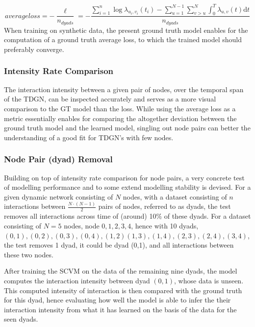 \begin{equation}
   average loss = - \frac{\ell}{n_{dyads}} = - \frac{\sum_{i=1}^n \log \lambda_{u_i,v_i} (t_i) - \sum_{u=1}^{N-1} \sum_{v > u}^{N} \int_{0}^T \lambda_{u,v}(t) \mathrm{d} t}{n_{dyads}}
    \label{eq:LogLikelihoodFuncExplicit}
\end{equation}
When training on synthetic data, the present ground truth model enables for the computation of a ground truth average loss, to which the trained model should preferably converge.


\subsubsection{Intensity Rate Comparison}
\label{sec:Method:Evaluation:Intensity}
The interaction intensity between a given pair of nodes, over the temporal span of the TDGN, can be inspected accurately and serves as a more visual comparison to the GT model than the loss. 
While using the average loss as a metric essentially enables for comparing the altogether deviation between the ground truth model and the learned model, singling out node pairs can better the understanding of a good fit for TDGN's with few nodes.




\subsubsection{Node Pair (dyad) Removal}
\label{sec:Method:Evaluation:NodePairRemoval}
Building on top of intensity rate comparison for node pairs, a very concrete test of modelling performance and to some extend modelling stability is devised.
For a given dynamic network consisting of $N$ nodes, with a dataset consisting of $n$ interactions between $\frac{N\cdot(N-1)}{2}$ pairs of nodes, referred to as dyads, the test removes all interactions across time of (around) 10\% of these dyads.
For a dataset consisting of $N = 5$ nodes, node $0,1,2,3,4$, hence with 10 dyads, $(0,1), (0,2), (0,3), (0,4), (1,2) (1,3), (1,4), (2,3), (2,4), (3,4)$, the test removes 1 dyad, it could be dyad (0,1), and all interactions between these two nodes.

After training the SCVM on the data of the remaining nine dyads, the model computes the interaction intensity between dyad $(0,1)$, whose data is unseen.
This computed intensity of interaction is then compared with the ground truth for this dyad, hence evaluating how well the model is able to infer the their interaction intensity from what it has learned on the basis of the data for the seen dyads.


